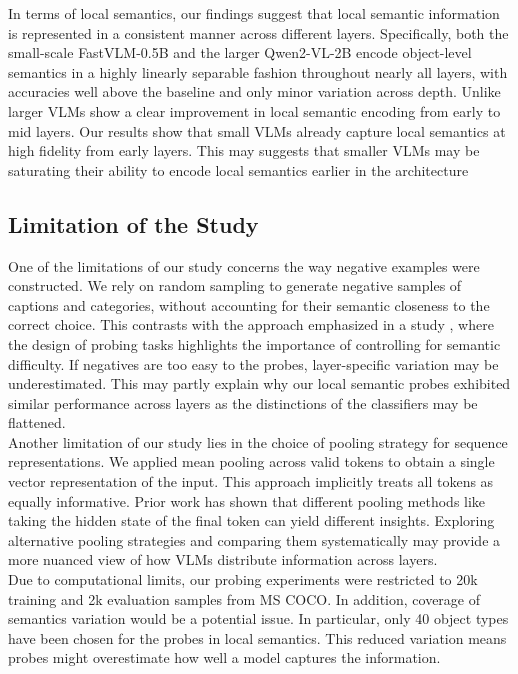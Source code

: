 \documentclass[11pt]{article}
\begin{document}
In terms of local semantics, our findings suggest that local semantic information is represented in a consistent manner across different layers.
Specifically, both the small-scale FastVLM-0.5B and the larger Qwen2-VL-2B encode object-level semantics in a highly linearly separable fashion throughout nearly all layers, with accuracies well above the baseline and only minor variation across depth.
Unlike larger VLMs show a clear improvement in local semantic encoding from early to mid layers. Our results show that small VLMs already capture local semantics at high fidelity from early layers.
This may suggests that smaller VLMs may be saturating their ability to encode local semantics earlier in the architecture

\subsection{Limitation of the Study}
One of the limitations of our study concerns the way negative examples were constructed. We rely on random sampling to generate negative samples of captions and categories, without accounting for their semantic closeness to the correct choice.
This contrasts with the approach emphasized in a study \cite{roesch2024EnhancingConceptualUnderstandinginMultimodal}, where the design of probing tasks highlights the importance of controlling for semantic difficulty.
If negatives are too easy to the probes, layer-specific variation may be underestimated.
This may partly explain why our local semantic probes exhibited similar performance across layers as the distinctions of the classifiers may be flattened. \\

Another limitation of our study lies in the choice of pooling strategy for sequence representations.
We applied mean pooling across valid tokens to obtain a single vector representation of the input. This approach implicitly treats all tokens as equally informative.
Prior work \cite{tang2024PoolingAndAttention} has shown that different pooling methods like taking the hidden state of the final token can yield different insights. Exploring alternative pooling strategies and comparing them systematically may provide a more nuanced view of how VLMs distribute information across layers. \\

Due to computational limits, our probing experiments were restricted to 20k training and 2k evaluation samples from MS COCO.
In addition, coverage of semantics variation would be a potential issue.
In particular, only 40 object types have been chosen for the probes in local semantics.
This reduced variation means probes might overestimate how well a model captures the information.
\end{document}
